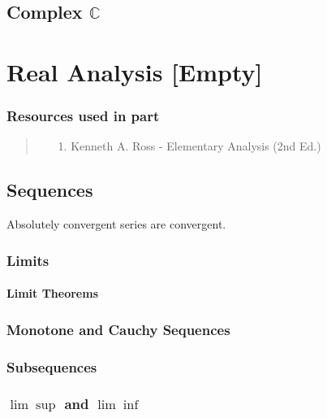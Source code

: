 \documentclass[12pt, english]{book}
\newenvironment{partintro}
{\vspace*{\fill}
	\section*{\centering Resources used in part \thepart}
	\begin{quotation}}
	{\end{quotation}\vspace*{\fill}\newpage}
\begin{document}
	\chapter{Complex \(\mathbb{C} \)} \label{Complex Chapter - Numbers}
	

	
	\part{Real Analysis [Empty]} \label{Real Analysis Part}
	\begin{partintro}
		\begin{itemize}
			\item[1.] Kenneth A. Ross - Elementary Analysis (2nd Ed.) \cite{Ross.K-Elementary-Analysis-2013}
		\end{itemize}
	\end{partintro}

	\chapter{Sequences} \label{Sequences Chapter - Real Analysis}
	
	\begin{corollary}
		\label{Absolute convergence implies convergence Corollary - Real}
		Absolutely convergent series are convergent.
	\end{corollary}
	
	\section{Limits} \label{Limits Section - Real Analysis}
	
	\subsection{Limit Theorems} \label{Limit Theorems Subsection - Real Analysis}
	
	\section{Monotone and Cauchy Sequences} \label{Monotone and Cauchy Sequences Section - Real Analysis}
	
	\section{Subsequences} \label{Subsequences Section - Real Analysis}
	
	\section{$\lim \operatorname{sup}$ and $\lim \operatorname{inf}$} \label{lim sup and lim inf Section - Real Analysis}
	
\end{document}
